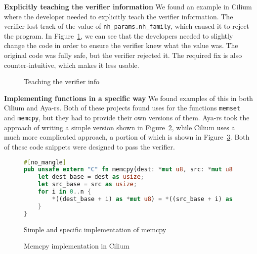 \noindent\textbf{Explicitly teaching the verifier information}
We found an example in Cilium where the developer needed to explicitly teach the verifier
    information.
The verifier lost track of the value of \texttt{nh\_params.nh\_family}, which caused it to reject the program.
In Figure~\ref{fig:teach-verifier}, we can see that the developers needed to slightly change the code in order to ensure the verifier knew what the value was.
The original code was fully safe, but the verifier rejected it.
The required fix is also counter-intuitive, which makes it less usable.

\begin{figure}
    
    \caption{Teaching the verifier info}
    \label{fig:teach-verifier}
\end{figure}

\noindent\textbf{Implementing functions in a specific way}
We found examples of this in both Cilium and Aya-rs.
Both of these projects found uses for the functions \texttt{memset} and \texttt{memcpy}, but they had to provide their own versions of them.
Aya-rs took the approach of writing a simple version shown in Figure~\ref{fig:aya-memcpy}, while Cilium uses a much more complicated approach, a portion of which is shown in Figure~\ref{fig:cilium-memcpy}.
Both of these code snippets were designed to pass the verifier.

\begin{figure}
    \begin{lstlisting}[language=rust]
#[no_mangle]
pub unsafe extern "C" fn memcpy(dest: *mut u8, src: *mut u8, n: usize) {
    let dest_base = dest as usize;
    let src_base = src as usize;
    for i in 0..n {
        *((dest_base + i) as *mut u8) = *((src_base + i) as *mut u8);
    }
}
    \end{lstlisting}
    \caption{Simple and specific implementation of memcpy}
    \label{fig:aya-memcpy}
\end{figure}

\begin{figure}
    
    \caption{Memcpy implementation in Cilium}
    \label{fig:cilium-memcpy}
\end{figure}

